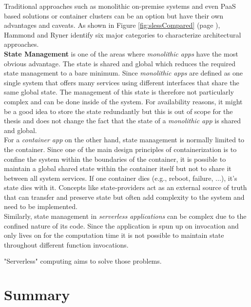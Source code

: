 Traditional approaches such as monolithic on-premise systems and even \acf{PaaS} based solutions or container clusters can be an option but have their own advantages and caveats. As shown in Figure \ref{fig:slessCompared}
(page \pageref{fig:slessCompared}), Hammond and Ryner identify six major categories to characterize architectural approaches.\\
\textbf{State Management} is one of the areas where \textit{monolithic apps} have the most obvious advantage. The state is shared and global which reduces the required state management to a bare minimum. Since \textit{monolithic apps} are defined as one single system that offers many services using different interfaces that share the same global state. \autocite{Villamizar2015EvaluatingCloud} The management of this state is therefore not particularly complex and can be done inside of the system. For availability reasons, it might be a good idea to store the state redundantly but this is out of scope for the thesis and does not change the fact that the state of a \textit{monolithic app} is shared and global.\\
For a \textit{container app} on the other hand, state management is normally limited to the container. Since one of the main design principles of containerization is to confine the system within the boundaries of the container, it is possible to maintain a global shared state within the container itself but not to share it between all system services. If one container dies (e.g., reboot, failure, ...), it's state dies with it. Concepts like state-providers act as an external source of truth that can transfer and preserve state but often add complexity to the system and need to be implemented.\autocite{Ling2004SessionState}\\
Similarly, state management in \textit{serverless applications} can be complex due to the confined nature of its code. Since the application is spun up on invocation and only lives on for the computation time it is not possible to maintain state throughout different function invocations.

"Serverless" computing aims to solve those problems.\autocite{Roberts2016ServerlessArchitectures}


\section{Summary}
